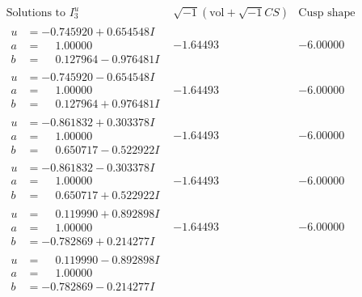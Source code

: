\documentclass[1p]{elsarticle_modified}
\theoremstyle{definition}
\newcommand{\I}{\sqrt{-1}}
\begin{document}
$$\begin{array}{c|c|c}  
\text{Solutions to }I^u_{3}& \I (\text{vol} + \sqrt{-1}CS) & \text{Cusp shape}\\
 \hline 
\begin{aligned}
u &= -0.745920 + 0.654548 I \\
a &= \phantom{-}1.00000\phantom{ +0.000000I} \\
b &= \phantom{-}0.127964 - 0.976481 I\end{aligned}
 & -1.64493\phantom{ +0.000000I} & -6.00000\phantom{ +0.000000I} \\ \hline\begin{aligned}
u &= -0.745920 - 0.654548 I \\
a &= \phantom{-}1.00000\phantom{ +0.000000I} \\
b &= \phantom{-}0.127964 + 0.976481 I\end{aligned}
 & -1.64493\phantom{ +0.000000I} & -6.00000\phantom{ +0.000000I} \\ \hline\begin{aligned}
u &= -0.861832 + 0.303378 I \\
a &= \phantom{-}1.00000\phantom{ +0.000000I} \\
b &= \phantom{-}0.650717 - 0.522922 I\end{aligned}
 & -1.64493\phantom{ +0.000000I} & -6.00000\phantom{ +0.000000I} \\ \hline\begin{aligned}
u &= -0.861832 - 0.303378 I \\
a &= \phantom{-}1.00000\phantom{ +0.000000I} \\
b &= \phantom{-}0.650717 + 0.522922 I\end{aligned}
 & -1.64493\phantom{ +0.000000I} & -6.00000\phantom{ +0.000000I} \\ \hline\begin{aligned}
u &= \phantom{-}0.119990 + 0.892898 I \\
a &= \phantom{-}1.00000\phantom{ +0.000000I} \\
b &= -0.782869 + 0.214277 I\end{aligned}
 & -1.64493\phantom{ +0.000000I} & -6.00000\phantom{ +0.000000I} \\ \hline\begin{aligned}
u &= \phantom{-}0.119990 - 0.892898 I \\
a &= \phantom{-}1.00000\phantom{ +0.000000I} \\
b &= -0.782869 - 0.214277 I\end{aligned}

\end{array}$$
\end{document}
